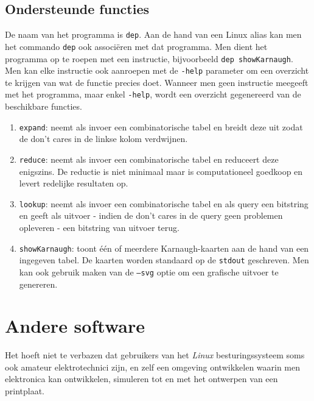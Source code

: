\subsection{Ondersteunde functies}
De naam van het programma is \texttt{dep}. Aan de hand van een Linux alias kan men het commando \texttt{dep} ook associ\"eren met dat programma. Men dient het programma op te roepen met een instructie, bijvoorbeeld \texttt{dep showKarnaugh}. Men kan elke instructie ook aanroepen met de \texttt{-help} parameter om een overzicht te krijgen van wat de functie precies doet. Wanneer men geen instructie meegeeft met het programma, maar enkel \texttt{-help}, wordt een overzicht gegenereerd van de beschikbare functies.
\begin{enumerate}
 \item \texttt{expand}: neemt als invoer een combinatorische tabel en breidt deze uit zodat de don't cares in de linkse kolom verdwijnen.
 \item \texttt{reduce}: neemt als invoer een combinatorische tabel en reduceert deze enigszins. De reductie is niet minimaal maar is computationeel goedkoop en levert redelijke resultaten op.
 \item \texttt{lookup}: neemt als invoer een combinatorische tabel en als query een bitstring en geeft als uitvoer - indien de don't cares in de query geen problemen opleveren - een bitstring van uitvoer terug.
 \item \texttt{showKarnaugh}: toont \'e\'en of meerdere Karnaugh-kaarten aan de hand van een ingegeven tabel. De kaarten worden standaard op de \texttt{stdout} geschreven. Men kan ook gebruik maken van de \texttt{--svg} optie om een grafische uitvoer te genereren.
\end{enumerate}

\section{Andere software}
Het hoeft niet te verbazen dat gebruikers van het \emph{Linux} besturingssysteem soms ook amateur elektrotechnici zijn, en zelf een omgeving ontwikkelen waarin men elektronica kan ontwikkelen, simuleren tot en met het ontwerpen van een printplaat.